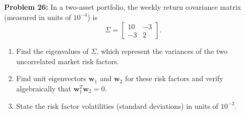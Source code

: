 \documentclass[11pt, letterpaper]{article}
\theoremstyle{definition}
\theoremstyle{remark}
\begin{document}
\vspace{0.4em}
\textbf{Problem 26:}
In a two-asset portfolio, the weekly return covariance matrix (measured in units of $10^{-4}$) is
\[
\Sigma = \begin{bmatrix} 10 & -3 \\ -3 & 2 \end{bmatrix}.
\]
\begin{enumerate}[label=(\alph*)]
    \item Find the eigenvalues of $\Sigma$, which represent the variances of the two uncorrelated market risk factors.
    \item Find unit eigenvectors $\mathbf{w}_1$ and $\mathbf{w}_2$ for these risk factors and verify algebraically that $\mathbf{w}_1^T \mathbf{w}_2 = 0$.
    \item State the risk factor volatilities (standard deviations) in units of $10^{-2}$.
\end{enumerate}
\end{document}

